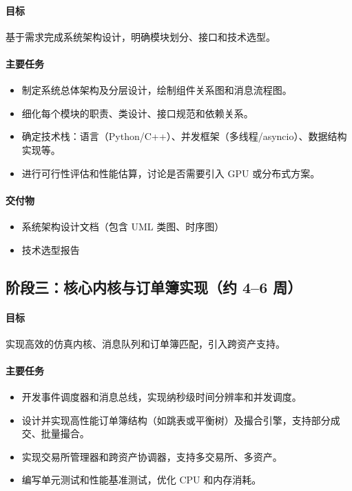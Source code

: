 \paragraph{目标} 基于需求完成系统架构设计，明确模块划分、接口和技术选型。

\paragraph{主要任务}
\begin{itemize}
  \item 制定系统总体架构及分层设计，绘制组件关系图和消息流程图。
  \item 细化每个模块的职责、类设计、接口规范和依赖关系。
  \item 确定技术栈：语言（Python/C++）、并发框架（多线程/asyncio）、数据结构实现等。
  \item 进行可行性评估和性能估算，讨论是否需要引入 GPU 或分布式方案。
\end{itemize}

\paragraph{交付物}
\begin{itemize}
  \item 系统架构设计文档（包含 UML 类图、时序图）
  \item 技术选型报告
\end{itemize}

\subsection{阶段三：核心内核与订单簿实现（约 4–6 周）}

\paragraph{目标} 实现高效的仿真内核、消息队列和订单簿匹配，引入跨资产支持。

\paragraph{主要任务}
\begin{itemize}
  \item 开发事件调度器和消息总线，实现纳秒级时间分辨率和并发调度。
  \item 设计并实现高性能订单簿结构（如跳表或平衡树）及撮合引擎，支持部分成交、批量撮合。
  \item 实现交易所管理器和跨资产协调器，支持多交易所、多资产。
  \item 编写单元测试和性能基准测试，优化 CPU 和内存消耗。
\end{itemize}

